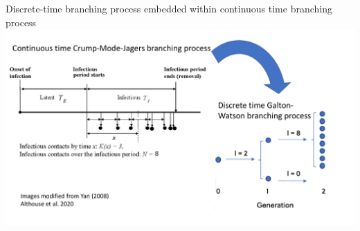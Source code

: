 \documentclass[
  ignorenonframetext,
]{beamer}
\begin{document}
\begin{frame}{Discrete-time branching process embedded within continuous
time branching process}
\protect\hypertarget{discrete-time-branching-process-embedded-within-continuous-time-branching-process}{}
\includegraphics[width=1.1\textwidth,height=\textheight]{BranchingProcesses.pdf}
\end{frame}
\end{document}
